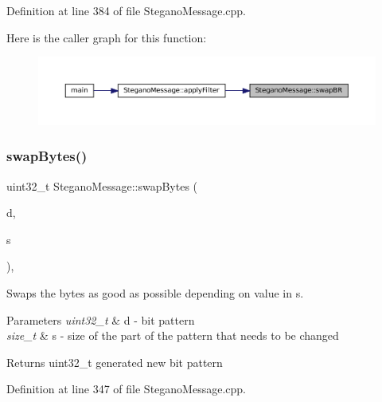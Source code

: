 Definition at line 384 of file Stegano\+Message.\+cpp.

Here is the caller graph for this function\+:
\nopagebreak
\begin{figure}[H]
\begin{center}
\leavevmode
\includegraphics[width=350pt]{classSteganoMessage_a530e5ee67cf45ac56f8f3be4d2b44d2e_icgraph}
\end{center}
\end{figure}
\mbox{\label{classSteganoMessage_af80189e6fb64aa4ae6cc48f92eaec147}} 
\subsubsection{\texorpdfstring{swapBytes()}{swapBytes()}}
{\footnotesize\ttfamily uint32\+\_\+t Stegano\+Message\+::swap\+Bytes (\begin{DoxyParamCaption}\item[{uint32\+\_\+t}]{d,  }\item[{size\+\_\+t}]{s }\end{DoxyParamCaption})\hspace{0.3cm}{\ttfamily [static]}, {\ttfamily [private]}}



Swaps the bytes as good as possible depending on value in s. 


\begin{DoxyParams}{Parameters}
{\em uint32\+\_\+t} & d -\/ bit pattern \\
\hline
{\em size\+\_\+t} & s -\/ size of the part of the pattern that needs to be changed \\
\hline
\end{DoxyParams}
\begin{DoxyReturn}{Returns}
uint32\+\_\+t generated new bit pattern 
\end{DoxyReturn}


Definition at line 347 of file Stegano\+Message.\+cpp.

